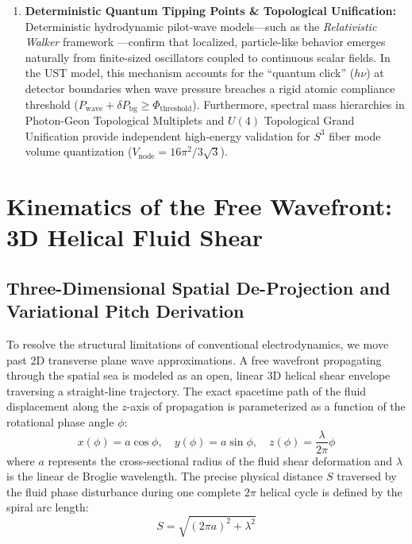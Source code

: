 \documentclass[11pt,a4paper]{article}
\begin{document}
\begin{enumerate}
		\item \textbf{Deterministic Quantum Tipping Points \& Topological Unification:}
		Deterministic hydrodynamic pilot-wave models—such as the \textit{Relativistic Walker} framework \cite{kulangiev2025}—confirm that localized, particle-like behavior emerges naturally from finite-sized oscillators coupled to continuous scalar fields. In the UST model, this mechanism accounts for the ``quantum click'' ($h\nu$) at detector boundaries when wave pressure breaches a rigid atomic compliance threshold ($P_{\text{wave}} + \delta P_{\text{bg}} \ge \Phi_{\text{threshold}}$). Furthermore, spectral mass hierarchies in Photon-Geon Topological Multiplets \cite{miley2025} and $U(4)$ Topological Grand Unification \cite{mastoridis2026} provide independent high-energy validation for $S^3$ fiber mode volume quantization ($V_{\text{node}} = 16\pi^2 / 3\sqrt{3}$).
	\end{enumerate}
	
	\section{Kinematics of the Free Wavefront: 3D Helical Fluid Shear}
	
	\subsection{Three-Dimensional Spatial De-Projection and Variational Pitch Derivation}
	To resolve the structural limitations of conventional electrodynamics, we move past 2D transverse plane wave approximations. A free wavefront propagating through the spatial sea is modeled as an open, linear 3D helical shear envelope traversing a straight-line trajectory. The exact spacetime path of the fluid displacement along the $z$-axis of propagation is parameterized as a function of the rotational phase angle $\phi$:
	\begin{equation}
		x(\phi) = a \cos\phi, \quad y(\phi) = a \sin\phi, \quad z(\phi) = \frac{\lambda}{2\pi} \phi
	\end{equation}
	where $a$ represents the cross-sectional radius of the fluid shear deformation and $\lambda$ is the linear de Broglie wavelength. The precise physical distance $S$ traversed by the fluid phase disturbance during one complete $2\pi$ helical cycle is defined by the spiral arc length:
	\begin{equation}
		S = \sqrt{(2\pi a)^2 + \lambda^2}
	\end{equation}
	
\end{document}
